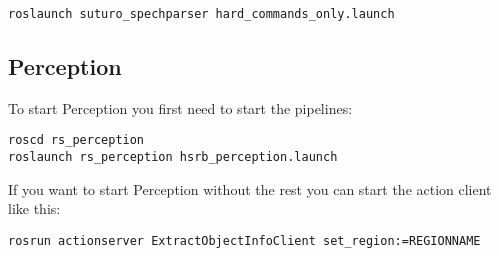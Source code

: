\documentclass[main.tex]{subfiles}
\begin{document}
	\begin{lstlisting}
roslaunch suturo_spechparser hard_commands_only.launch
\end{lstlisting}
	
	\subsection{Perception}

	To start Perception you first need to start the pipelines:\\
	\begin{lstlisting}
roscd rs_perception
roslaunch rs_perception hsrb_perception.launch
\end{lstlisting}	

If you want to start Perception without the rest you can start the action client like this:\\
\begin{lstlisting}
rosrun actionserver ExtractObjectInfoClient set_region:=REGIONNAME
\end{lstlisting}
\end{document}
